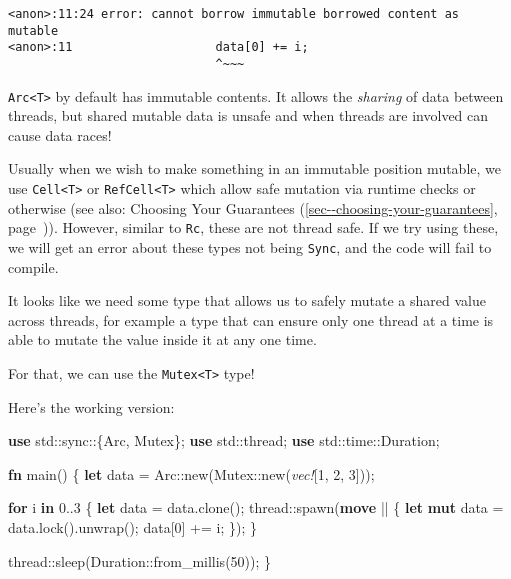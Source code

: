 \documentclass[a4paper,]{book}
\renewcommand*{\hyperlink}[2]{%
 #2 (\autoref{#1}, page~\pageref{#1})}
\newenvironment{Shaded}{\begin{snugshade}}{\end{snugshade}}
\newcommand{\KeywordTok}[1]{\textcolor[rgb]{0.13,0.29,0.53}{\textbf{{#1}}}}
\newcommand{\DecValTok}[1]{\textcolor[rgb]{0.00,0.00,0.81}{{#1}}}
\newcommand{\PreprocessorTok}[1]{\textcolor[rgb]{0.56,0.35,0.01}{\textit{{#1}}}}
\newcommand{\NormalTok}[1]{{#1}}
\begin{document}
\begin{verbatim}
<anon>:11:24 error: cannot borrow immutable borrowed content as mutable
<anon>:11                    data[0] += i;
                             ^~~~
\end{verbatim}

\texttt{Arc\textless{}T\textgreater{}} by default has immutable
contents. It allows the \emph{sharing} of data between threads, but
shared mutable data is unsafe and when threads are involved can cause
data races!

Usually when we wish to make something in an immutable position mutable,
we use \texttt{Cell\textless{}T\textgreater{}} or
\texttt{RefCell\textless{}T\textgreater{}} which allow safe mutation via
runtime checks or otherwise (see also:
\protect\hyperlink{sec--choosing-your-guarantees}{Choosing Your
Guarantees}). However, similar to \texttt{Rc}, these are not thread
safe. If we try using these, we will get an error about these types not
being \texttt{Sync}, and the code will fail to compile.

It looks like we need some type that allows us to safely mutate a shared
value across threads, for example a type that can ensure only one thread
at a time is able to mutate the value inside it at any one time.

For that, we can use the \texttt{Mutex\textless{}T\textgreater{}} type!

Here's the working version:

\begin{Shaded}
\begin{Highlighting}[]
\KeywordTok{use} \NormalTok{std::sync::\{Arc, Mutex\};}
\KeywordTok{use} \NormalTok{std::thread;}
\KeywordTok{use} \NormalTok{std::time::Duration;}

\KeywordTok{fn} \NormalTok{main() \{}
    \KeywordTok{let} \NormalTok{data = Arc::new(Mutex::new(}\PreprocessorTok{vec!}\NormalTok{[}\DecValTok{1}\NormalTok{, }\DecValTok{2}\NormalTok{, }\DecValTok{3}\NormalTok{]));}

    \KeywordTok{for} \NormalTok{i }\KeywordTok{in} \DecValTok{0.}\NormalTok{.}\DecValTok{3} \NormalTok{\{}
        \KeywordTok{let} \NormalTok{data = data.clone();}
        \NormalTok{thread::spawn(}\KeywordTok{move} \NormalTok{|| \{}
            \KeywordTok{let} \KeywordTok{mut} \NormalTok{data = data.lock().unwrap();}
            \NormalTok{data[}\DecValTok{0}\NormalTok{] += i;}
        \NormalTok{\});}
    \NormalTok{\}}

    \NormalTok{thread::sleep(Duration::from_millis(}\DecValTok{50}\NormalTok{));}
\NormalTok{\}}
\end{Highlighting}
\end{Shaded}
\end{document}

